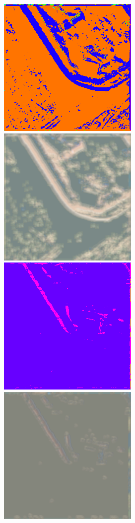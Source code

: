 \begin{figure}
    \includegraphics[width=\WnetPredictionsImageWidth]{images/wnet/46d-6/63585-prediction} \hfill
    \includegraphics[width=\WnetPredictionsImageWidth]{images/wnet/46d-6/63585-restored} \hfill
    \includegraphics[width=\WnetPredictionsImageWidth]{images/wnet/36d-20/63585-prediction} \hfill
    \includegraphics[width=\WnetPredictionsImageWidth]{images/wnet/36d-20/63585-restored} \hfill

\end{figure}
